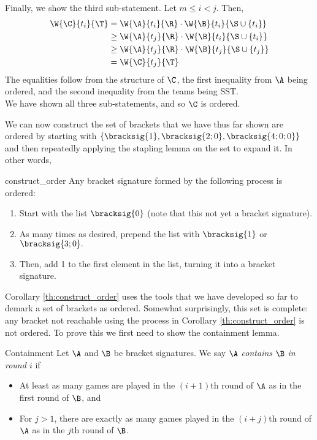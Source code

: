 {{Finally, we show the third sub-statement. Let $m \leq i < j.$ Then,
\begin{align*}
    \W{\C}{t_i}{\T} &= \W{\A}{t_i}{\R} \cdot \W{\B}{t_i}{\S \cup \{t_i\}}\\
    &\geq \W{\A}{t_j}{\R} \cdot \W{\B}{t_i}{\S \cup \{t_i\}}\\
    &\geq \W{\A}{t_j}{\R} \cdot \W{\B}{t_j}{\S \cup \{t_j\}}\\
    &= \W{\C}{t_j}{\T}
\end{align*}
The equalities follow from the structure of $\C$, the first inequality from $\A$ being ordered, and the second inequality from the teams being SST.\\

We have shown all three sub-statements, and so $\C$ is ordered.
}{}

We can now construct the set of brackets that we have thus far shown are ordered by starting with $\{\bracksig{1}, \bracksig{2; 0}, \bracksig{4; 0; 0}\}$ and then repeatedly applying the stapling lemma on the set to expand it. In other words,

\begin{corollary}{}{construct_order}
    Any bracket signature formed by the following process is ordered:
    \begin{enumerate}
        \item Start with the list $\bracksig{0}$ (note that this not yet a bracket signature).
        \item As many times as desired, prepend the list with $\bracksig{1}$ or $\bracksig{3; 0}.$
        \item Then, add 1 to the first element in the list, turning it into a bracket signature.
    \end{enumerate}
\end{corollary}

Corollary \ref{th:construct_order} uses the tools that we have developed so far to demark a set of brackets as ordered. Somewhat surprisingly, this set is complete: any bracket not reachable using the process in Corollary \ref{th:construct_order} is not ordered. To prove this we first need to show the containment lemma.

\begin{definition}{Containment}{}
    Let $\A$ and $\B$ be bracket signatures. We say $\A$ \textit{contains} $\B$ \textit{in round $i$} if
    \begin{itemize}
        \item At least as many games are played in the $(i+1)$th round of $\A$ as in the first round of $\B$, and
        \item For $j > 1$, there are exactly as many games played in the $(i + j)$th round of $\A$ as in the $j$th round of $\B$.
    \end{itemize}
\end{definition}

}
